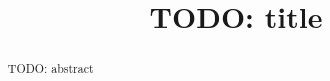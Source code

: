 
\begin{frontmatter}

\title{TODO: title}


\begin{abstract}
TODO: abstract
\end{abstract}

\begin{comment}
\begin{keyword}
\end{keyword}
\end{comment}

\end{frontmatter}
